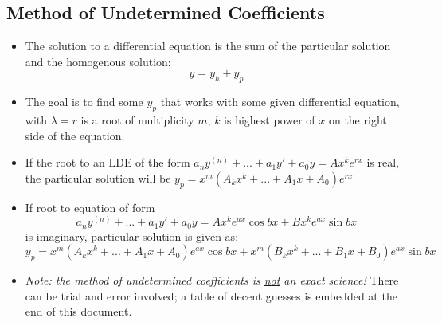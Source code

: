 \documentclass[10pt,letterpaper]{article}
\begin{document}
\subsection*{Method of Undetermined Coefficients}
\begin{itemize}
\item The solution to a differential equation is the sum of the particular solution and the homogenous solution: 
$$ y= y_h+y_p$$
\item The goal is to find some $y_p$ that works with some given differential equation, with $\lambda = r$ is a root of multiplicity $m$, $k$ is highest power of $x$ on the right side of the equation. 
\item If the root to an LDE of the form $a_ny^{(n)}+...+a_1y'+a_0y=Ax^ke^{rx}$ is real, the particular solution will be $y_p=x^m(A_kx^k+...+A_1x+A_0)e^{rx}$
\item If root to equation of form 
$$ a_ny^{(n)}+...+a_1y'+a_0y=Ax^ke^{ax}\cos bx+Bx^ke^{ax}\sin bx $$
is imaginary, particular solution is given as: 
$$ y_p = x^m(A_kx^k+...+A_1x+A_0)e^{ax}\cos bx + x^m(B_kx^k+...+B_1x+B_0)e^{ax}\sin bx $$
\item \textit{Note: the method of undetermined coefficients is \underline{not} an exact science!} There can be trial and error involved; a table of decent guesses is embedded at the end of this document. 
\end{itemize}
\end{document}
